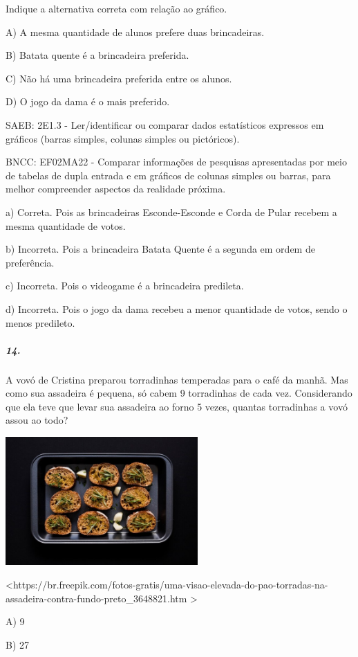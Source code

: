 Indique a alternativa correta com relação ao gráfico.

A) A mesma quantidade de alunos prefere duas brincadeiras.

B) Batata quente é a brincadeira preferida.

C) Não há uma brincadeira preferida entre os alunos.

D) O jogo da dama é o mais preferido.

SAEB: 2E1.3 - Ler/identificar ou comparar dados estatísticos expressos
em gráficos (barras simples, colunas simples ou pictóricos).

BNCC: EF02MA22 - Comparar informações de pesquisas apresentadas por meio
de tabelas de dupla entrada e em gráficos de colunas simples ou barras,
para melhor compreender aspectos da realidade próxima.

a) Correta. Pois as brincadeiras Esconde-Esconde e Corda de Pular
recebem a mesma quantidade de votos.

b) Incorreta. Pois a brincadeira Batata Quente é a segunda em ordem de
preferência.

c) Incorreta. Pois o videogame é a brincadeira predileta.

d) Incorreta. Pois o jogo da dama recebeu a menor quantidade de votos,
sendo o menos predileto.

\subparagraph{14. }\label{section-158}

A vovó de Cristina preparou torradinhas temperadas para o café da manhã.
Mas como sua assadeira é pequena, só cabem 9 torradinhas de cada vez.
Considerando que ela teve que levar sua assadeira ao forno 5 vezes,
quantas torradinhas a vovó assou ao todo?

\includegraphics[width=2.89583in,height=1.93056in]{media/image172.jpeg}

\textless{}https://br.freepik.com/fotos-gratis/uma-visao-elevada-do-pao-torradas-na-assadeira-contra-fundo-preto\_3648821.htm
\textgreater{}

A) 9

B) 27

